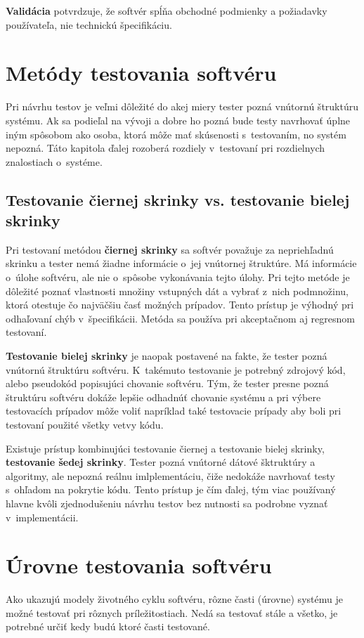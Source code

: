 \textbf{Validácia} potvrdzuje, že softvér spĺňa obchodné podmienky a požiadavky používateľa, nie technickú špecifikáciu.

\section{Metódy testovania softvéru}
Pri návrhu testov je veľmi dôležité do akej miery tester pozná vnútornú štruktúru systému.
Ak sa podieľal na vývoji a dobre ho pozná bude testy navrhovať úplne iným spôsobom ako osoba, ktorá môže mať skúsenosti s~testovaním, no systém nepozná.
Táto kapitola ďalej rozoberá rozdiely v~testovaní pri rozdielnych znalostiach o~systéme.

\subsection*{Testovanie čiernej skrinky vs. testovanie bielej skrinky}
\label{blackbox_vs_whitebox}
Pri testovaní metódou \textbf{čiernej skrinky} sa softvér považuje za nepriehľadnú skrinku a tester nemá žiadne informácie o~jej vnútornej štruktúre.
Má informácie o~úlohe softvéru, ale nie o~spôsobe vykonávania tejto úlohy.
Pri tejto metóde je dôležité poznať vlastnosti množiny vstupných dát a vybrať z~nich podmnožinu, ktorá otestuje čo najväčšiu časť možných prípadov.
Tento prístup je výhodný pri odhaľovaní chýb v~špecifikácii.
Metóda sa používa pri akceptačnom aj regresnom testovaní.

\textbf{Testovanie bielej skrinky} je naopak postavené na fakte, že tester pozná vnútornú štruktúru softvéru.
K~takémuto testovanie je potrebný zdrojový kód, alebo pseudokód popisujúci chovanie softvéru.
Tým, že tester presne pozná štruktúru softvéru dokáže lepšie odhadnúť chovanie systému a pri výbere testovacích prípadov môže voliť napríklad také testovacie prípady aby boli pri testovaní použité všetky vetvy kódu.

Existuje prístup kombinujúci testovanie čiernej a testovanie bielej skrinky, \textbf{testovanie šedej skrinky}.
Tester pozná vnútorné dátové šktruktúry a algoritmy, ale nepozná reálnu imlplementáciu, čiže nedokáže navrhovať testy s~ohľadom na pokrytie kódu.
Tento prístup je čím ďalej, tým viac používaný hlavne kvôli zjednodušeniu návrhu testov bez nutnosti sa podrobne vyznať v~implementácii.

\section{Úrovne testovania softvéru}
\label{testing_levels}
Ako ukazujú modely životného cyklu softvéru, rôzne časti (úrovne) systému je možné testovať pri rôznych príležitostiach. 
Nedá sa testovať stále a všetko, je potrebné určiť kedy budú ktoré časti testované.

